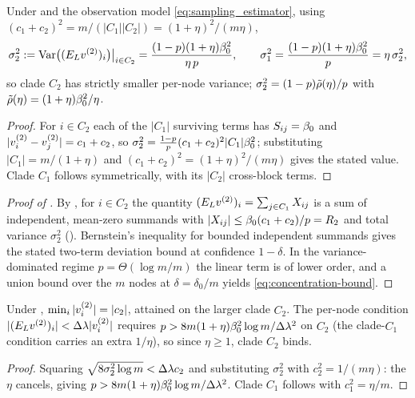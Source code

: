 \begin{proposition}\label{prop:C-var}
Under  and the observation model \eqref{eq:sampling_estimator}, using
$(c_1+c_2)^2=m/(|C_1||C_2|)=(1+\eta)^2/(m\eta)$,
\begin{equation}
   \sigma_2^2:=\operatorname{Var}\bigl((E_{L}v^{(2)})_i\bigr)\big|_{i\in C_2}
   =\frac{(1-p)(1+\eta)\beta_0^2}{\eta\,p},
   \qquad
   \sigma_1^2=\frac{(1-p)(1+\eta)\beta_0^2}{p}=\eta\,\sigma_2^2,
\end{equation}
so clade $C_2$ has strictly smaller per-node variance;
$\sigma_2^2=(1-p)\tilde\rho(\eta)/p$ with $\tilde\rho(\eta)=(1+\eta)\beta_0^2/\eta$.
\end{proposition}
\begin{proof}
For $i\in C_2$ each of the $|C_1|$ surviving terms has $S_{ij}=\beta_0$ and
$|v^{(2)}_i-v^{(2)}_j|=c_1+c_2$, so $\sigma_2^2=\tfrac{1-p}{p}(c_1+c_2)^2|C_1|\beta_0^2$;
substituting $|C_1|=m/(1+\eta)$ and $(c_1+c_2)^2=(1+\eta)^2/(m\eta)$ gives the stated
value. Clade $C_1$ follows symmetrically, with its $|C_2|$ cross-block terms.
\end{proof}

\begin{proof}[Proof of ]
By , for $i\in C_2$ the quantity
$(E_{L}v^{(2)})_i=\sum_{j\in C_1}X_{ij}$ is a sum of independent, mean-zero summands with
$|X_{ij}|\le\beta_0(c_1+c_2)/p=R_2$ and total variance $\sigma_2^2$
(). Bernstein's inequality for bounded independent summands gives
the stated two-term deviation bound at confidence $1-\delta$. In the
variance-dominated regime $p=\Theta(\log m/m)$ the linear term is of lower order,
and a union bound over the $m$ nodes at $\delta=\delta_0/m$ yields
\eqref{eq:concentration-bound}.
\end{proof}

\begin{proposition}\label{prop:C-bind}
Under , $\min_i|v^{(2)}_i|=|c_2|$, attained on the larger clade $C_2$. The
per-node condition $|(E_{L}v^{(2)})_i|<\Delta\lambda|v^{(2)}_i|$ requires
$p>8m(1+\eta)\beta_0^2\log m/\Delta\lambda^2$ on $C_2$ (the clade-$C_1$ condition carries an extra
$1/\eta$), so since $\eta\ge1$, clade $C_2$ binds.
\end{proposition}
\begin{proof}
Squaring $\sqrt{8\sigma_2^2\log m}<\Delta\lambda c_2$ and substituting $\sigma_2^2$ with
$c_2^2=1/(m\eta)$: the $\eta$ cancels, giving
$p>8m(1+\eta)\beta_0^2\log m/\Delta\lambda^2$. Clade $C_1$ follows with $c_1^2=\eta/m$.
\end{proof}

